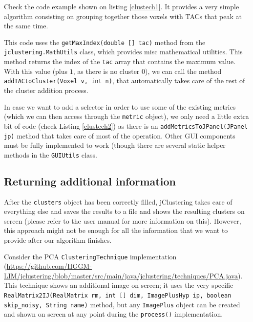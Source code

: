 \documentclass[11pt]{article} %
\begin{document}
Check the code example shown on listing \ref{clustech1}. It provides a very simple algorithm consisting on grouping together those voxels with TACs that peak at the same time.



This code uses the {\tt getMaxIndex(double [] tac)} method from the {\tt jclustering.MathUtils} class, which provides misc mathematical utilities. This method returns the index of the {\tt tac} array that contains the maximum value. With this value (plus $1$, as there is no cluster 0), we can call the method {\tt addTACtoCluster(Voxel v, int n)}, that automatically takes care of the rest of the cluster addition process.

In case we want to add a selector in order to use some of the existing metrics (which we can then access through the {\tt metric} object), we only need a little extra bit of code (check Listing \ref{clustech2}) as there is an {\tt addMetricsToJPanel(JPanel jp)} method that takes care of most of the operation. Other GUI components must be fully implemented to work (though there are several static helper methods in the {\tt GUIUtils} class.



\subsection{Returning additional information}
\label{subsec:clustech_additional}

After the {\tt clusters} object has been correctly filled, jClustering takes care of everything else and saves the results to a file and shows the resulting clusters on screen (please refer to the user manual for more information on this). However, this approach might not be enough for all the information that we want to provide after our algorithm finishes.

Consider the PCA {\tt ClusteringTechnique} implementation (\url{https://github.com/HGGM-LIM/jclustering/blob/master/src/main/java/jclustering/techniques/PCA.java}). This technique shows an additional image on screen; it uses the very specific {\tt RealMatrix2IJ(RealMatrix rm, int [] dim, ImagePlusHyp ip, boolean skip\_noisy, String name)} method, but any {\tt ImagePlus} object can be created and shown on screen at any point during the {\tt process()} implementation. 
\end{document}

